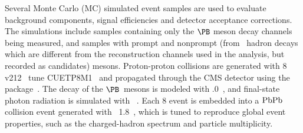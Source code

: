 Several Monte Carlo (MC) simulated event samples are used to evaluate background components, signal efficiencies and detector acceptance corrections. The simulations include samples containing only the $\PB$ meson decay channels being measured, and samples with prompt and nonprompt \PJGy (from \PQb\ hadron decays which are different from the reconstruction channels used in the analysis, but recorded as candidates) mesons. Proton-proton collisions are generated with {\PYTHIA}8 v212~\cite{Sjostrand:2014zea} tune CUETP8M1~\cite{Khachatryan:2015pea} and propagated through the CMS detector using the \GEANTfour package~\cite{Allison:2016lfl}. The decay of the $\PB$~mesons is modeled with .0~\cite{Lange:2001uf}, and final-state photon radiation is simulated with ~\cite{Barberio:1990ms}. Each {\PYTHIA}8 event is embedded into a $\mathrm{PbPb}$ collision event generated with {\HYDJET}~1.8~\cite{Lokhtin:2005px}, which is tuned to reproduce global event properties, such as the charged-hadron \pt spectrum and particle multiplicity.

